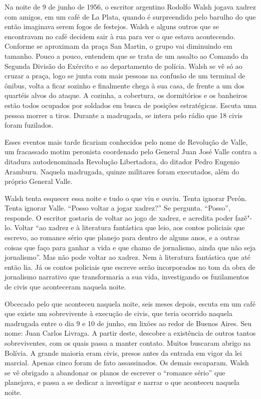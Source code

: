 \asterisc

Na noite de 9 de junho de 1956, o escritor argentino Rodolfo Walsh
jogava xadrez com amigos, em um café de La Plata, quando é surpreendido
pelo barulho do que então imaginava serem fogos de festejos. Walsh e
alguns outros que se encontravam no café decidem sair à rua para ver o
que estava acontecendo. Conforme se aproximam da praça San Martin, o
grupo vai diminuindo em tamanho. Pouco a pouco, entendem que se trata de
um assalto ao Comando da Segunda Divisão do Exército e ao departamento
de polícia. Walsh se vê só ao cruzar a praça, logo se junta com mais
pessoas na confusão de um terminal de ônibus, volta a ficar sozinho e
finalmente chega à sua casa, de frente a um dos quartéis alvos do
ataque. A cozinha, a cobertura, os dormitórios e os banheiros estão
todos ocupados por soldados em busca de posições estratégicas. Escuta
uma pessoa morrer a tiros. Durante a madrugada, se intera pelo rádio que
18 civis foram fuzilados.

Esses eventos mais tarde ficariam conhecidos pelo nome de Revolução de
Valle, um fracassado motim peronista coordenado pelo General Juan José
Valle contra a ditadura autodenominada Revolução Libertadora, do ditador
Pedro Eugenio Aramburu. Naquela madrugada, quinze militares foram
executados, além do próprio General Valle.

Walsh tenta esquecer essa noite e tudo o que viu e ouviu. Tenta ignorar
Perón. Tenta ignorar Valle. ``Posso voltar a jogar xadrez?'' Se
pergunta. ``Posso'', responde. O escritor gostaria de voltar ao jogo de
xadrez, e acredita poder fazê"-lo. Voltar ``ao xadrez e à literatura
fantástica que leio, aos contos policiais que escrevo, ao romance sério
que planejo para dentro de alguns anos, e a outras coisas que faço para
ganhar a vida e que chamo de jornalismo, ainda que não seja
jornalismo''. Mas não pode voltar ao xadrez. Nem à literatura fantástica
que até então lia. Já os contos policiais que escreve serão
incorporados no tom da obra de jornalismo narrativo que transformaria a
sua vida, investigando os fuzilamentos de civis que aconteceram naquela
noite.

Obcecado pelo que aconteceu naquela noite, seis meses depois, escuta em
um café que existe um sobrevivente à execução de civis, que teria
ocorrido naquela madrugada entre o dia 9 e 10 de junho, em lixões ao
redor de Buenos Aires. Seu nome: Juan Carlos Livraga. A partir deste,
descobre a existência de outros tantos sobreviventes, com os quais passa
a manter contato. Muitos buscaram abrigo na Bolívia. A grande
maioria eram civis, presos antes da entrada em vigor da lei marcial.
Apenas cinco foram de fato assassinados. Os demais escaparam.
Walsh se vê obrigado a abandonar os planos de escrever o ``romance
sério'' que planejava, e passa a se dedicar a investigar e narrar o que
aconteceu naquela noite.

